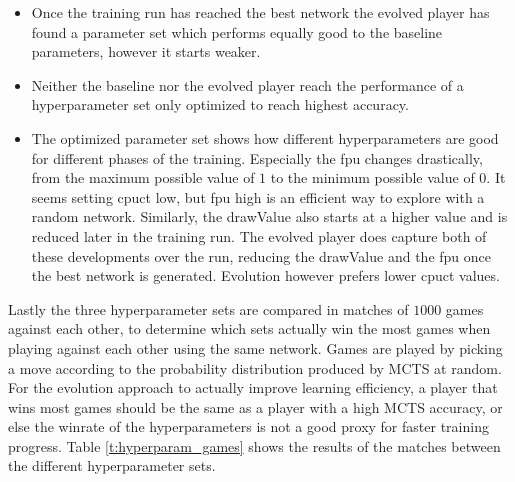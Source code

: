 \documentclass[12pt,onecolumn,oneside,titlepage]{article}
\begin{document}
\begin{itemize}
 \item Once the training run has reached the best network the evolved player has found a parameter set which performs equally good to the baseline parameters, however it starts weaker.
 \item Neither the baseline nor the evolved player reach the performance of a hyperparameter set only optimized to reach highest accuracy.
 \item The optimized parameter set shows how different hyperparameters are good for different phases of the training. Especially the fpu changes drastically, from the maximum possible value of $1$ to the minimum possible value of $0$. It seems
 setting cpuct low, but fpu high is an efficient way to explore with a random network. Similarly, the drawValue also starts at a higher value and is reduced later in the training run. The evolved player does capture both of these developments over the run,
 reducing the drawValue and the fpu once the best network is generated. Evolution however prefers lower cpuct values.
\end{itemize}


Lastly the three hyperparameter sets are compared in matches of $1000$ games against each other, to determine which sets actually win the most games when playing against each other using the same network. Games are played by picking a move according
to the probability distribution produced by MCTS at random.
For the evolution approach to actually improve learning efficiency, a player that wins most games should be the same as a player with a high MCTS accuracy, or else the winrate of the hyperparameters is not a good proxy for faster training progress.
Table \ref{t:hyperparam_games} shows the results of the matches between the different hyperparameter sets.
\end{document}
